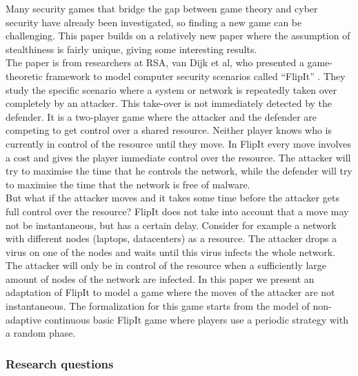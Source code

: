 Many security games that bridge the gap between game theory and cyber security have already been investigated, so finding a new game can be challenging. This paper builds on a relatively new paper where the assumption of stealthiness is fairly unique, giving some interesting results.\\ 
 The paper is from researchers at RSA, van Dijk et al,  who presented a game-theoretic framework to model computer security scenarios called ``FlipIt'' \cite{FlipIt}. They study the specific scenario where a system or network is repeatedly taken over completely by an attacker. This take-over is not immediately detected by the defender. It is a two-player game where the attacker and the defender are competing to get control over a shared resource. Neither player knows who is currently in control of the resource until they move. In FlipIt every move involves a cost and gives the player immediate control over the resource. The attacker will try to maximise the time that he controls the network, while the defender will try to maximise the time that the network is free of malware. \\
 But what if the attacker moves and it takes some time before the attacker gets full control over the resource? FlipIt does not take into account that a move may not be instantaneous, but has a certain delay. Consider for example a network with different nodes (laptops, datacenters) as a resource. The attacker drops a virus on one of the nodes and waits until this virus infects the whole network. The attacker will only be in control of the resource when a sufficiently large amount of nodes of the network are infected. In this paper we present an adaptation of FlipIt to model a game where the moves of the attacker are not instantaneous. The formalization for this game starts from the model of non-adaptive continuous basic FlipIt game where players use a periodic strategy with a random phase.   \\

\subsubsection{Research questions}


